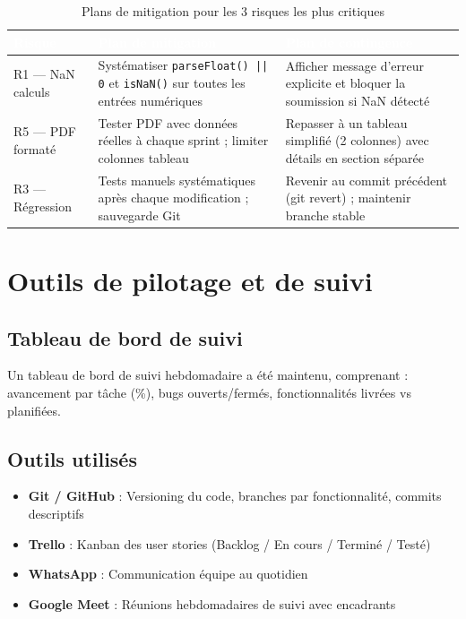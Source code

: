 \documentclass[12pt,a4paper]{report}
\begin{document}
\begin{table}[H]
\centering
\caption{Plans de mitigation pour les 3 risques les plus critiques}
\label{tab:mitigation}
\begin{tabularx}{\textwidth}{|l|X|X|}
\hline
\rowcolor{emsiblue}\textcolor{white}{\textbf{Risque}} & \textcolor{white}{\textbf{Plan de mitigation}} & \textcolor{white}{\textbf{Plan de contingence}} \\
\hline
R1 — NaN calculs & Systématiser \texttt{parseFloat() || 0} et \texttt{isNaN()} sur toutes les entrées numériques & Afficher message d'erreur explicite et bloquer la soumission si NaN détecté \\
R5 — PDF formaté & Tester PDF avec données réelles à chaque sprint ; limiter colonnes tableau & Repasser à un tableau simplifié (2 colonnes) avec détails en section séparée \\
R3 — Régression & Tests manuels systématiques après chaque modification ; sauvegarde Git & Revenir au commit précédent (git revert) ; maintenir branche stable \\
\hline
\end{tabularx}
\end{table}

\section{Outils de pilotage et de suivi}

\subsection{Tableau de bord de suivi}

Un tableau de bord de suivi hebdomadaire a été maintenu, comprenant : avancement par tâche (\%), bugs ouverts/fermés, fonctionnalités livrées vs planifiées.

\subsection{Outils utilisés}

\begin{itemize}
    \item \textbf{Git / GitHub} : Versioning du code, branches par fonctionnalité, commits descriptifs
    \item \textbf{Trello} : Kanban des user stories (Backlog / En cours / Terminé / Testé)
    \item \textbf{WhatsApp} : Communication équipe au quotidien
    \item \textbf{Google Meet} : Réunions hebdomadaires de suivi avec encadrants
\end{itemize}
\end{document}

